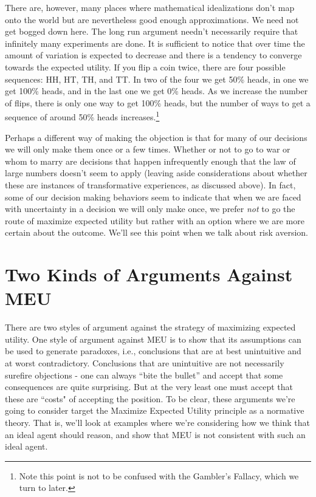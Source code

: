 \documentclass[]{tufte-book}
\begin{document}
There are, however, many places where mathematical idealizations don't map onto the world but are nevertheless good enough approximations. We need not get bogged down here. The long run argument needn't necessarily require that infinitely many experiments are done. It is sufficient to notice that over time the amount of variation is expected to decrease and there is a tendency to converge towards the expected utility. If you flip a coin twice, there are four possible sequences: HH, HT, TH, and TT. In two of the four we get 50\% heads, in one we get 100\% heads, and in the last one we get 0\% heads. As we increase the number of flips, there is only one way to get 100\% heads, but the number of ways to get a sequence of around 50\% heads increases.\footnote{Note this point is not to be confused with the Gambler's Fallacy, which we turn to later.}

Perhaps a different way of making the objection is that for many of our decisions we will only make them once or a few times. Whether or not to go to war or whom to marry are decisions that happen infrequently enough that the law of large numbers doesn't seem to apply (leaving aside considerations about whether these are instances of transformative experiences, as discussed above). In fact, some of our decision making behaviors seem to indicate that when we are faced with uncertainty in a decision we will only make once, we prefer \emph{not} to go the route of maximize expected utility but rather with an option where we are more certain about the outcome. We'll see this point when we talk about risk aversion.

\hypertarget{two-kinds-of-arguments-against-meu}{%
\section{Two Kinds of Arguments Against MEU}\label{two-kinds-of-arguments-against-meu}}

There are two styles of argument against the strategy of maximizing expected utility. One style of argument against MEU is to show that its assumptions can be used to generate paradoxes, i.e., conclusions that are at best unintuitive and at worst contradictory. Conclusions that are unintuitive are not necessarily surefire objections - one can always ``bite the bullet'' and accept that some consequences are quite surprising. But at the very least one must accept that these are ``costs" of accepting the position. To be clear, these arguments we're going to consider target the Maximize Expected Utility principle as a normative theory. That is, we'll look at examples where we're considering how we think that an ideal agent should reason, and show that MEU is not consistent with such an ideal agent.
\end{document}
